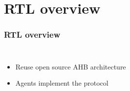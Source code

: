 \documentclass[]{beamer}
\begin{document}
       \section{RTL overview}
         \begin{frame}
           \frametitle{RTL overview}
           \begin{columns}
             \begin{itemize}
             \item<1-> Reuse open source AHB architecture
             \item<2-> Agents implement the protocol
             \end{itemize}
             \centering

\end{columns}
\end{frame}
\end{document}
